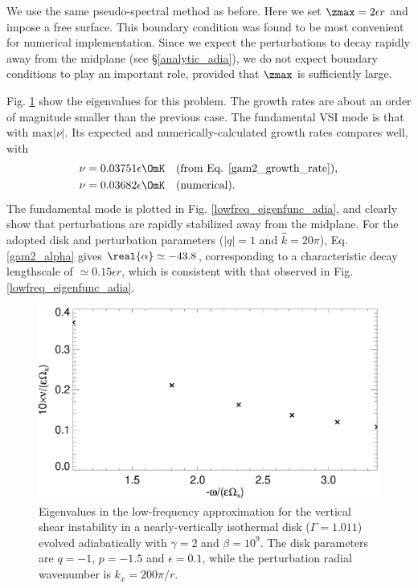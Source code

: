 We use the same pseudo-spectral method as before. Here we set
$\zmax = 2\epsilon r$ and impose a free surface. This boundary
condition was found to be most convenient for numerical
implementation. Since we expect the perturbations to decay rapidly
away from the midplane (see \S\ref{analytic_adia}), we do not expect 
boundary conditions to play an important role, provided that $\zmax$ is
sufficiently large. 

Fig. \ref{lowfreq_eigen_adia} show the eigenvalues for this
problem. The growth rates are about an order of magnitude smaller than
the previous case. The fundamental VSI mode is that with
$\mathrm{max}|\nu|$. Its expected and numerically-calculated growth
rates compares well, with 
\begin{align*}
  \nu = 0.03751 \epsilon \OmK &\quad \text{(from
    Eq. \ref{gam2_growth_rate})},\\
  \nu = 0.03682 \epsilon \OmK &\quad \text{(numerical)}.
\end{align*}
The fundamental mode is plotted in Fig. \ref{lowfreq_eigenfunc_adia},
and clearly show that perturbations are rapidly stabilized away from
the midplane. For the adopted disk and perturbation parameters 
($|q|=1$ and $\hat{k} = 20\pi$), Eq. \ref{gam2_alpha} gives $\real{\alpha}\simeq - 43.8$,
corresponding to a characteristic decay lengthscale of $\simeq
0.15\epsilon r$, which is consistent with that observed in 
Fig. \ref{lowfreq_eigenfunc_adia}. 

\begin{figure}
  \includegraphics[width=\linewidth]{figures/eigenvalues_adia}
  \caption{Eigenvalues in the low-frequency approximation for the
    vertical shear instability in a nearly-vertically isothermal disk
    ($\Gamma=1.011$) evolved adiabatically with $\gamma=2$ and
    $\beta=10^9$. The disk
    parameters are $q=-1$, 
    $p=-1.5$ and $\epsilon=0.1$, while the perturbation radial
    wavenumber is $k_x=200\pi/r$. \label{lowfreq_eigen_adia}
  }
\end{figure}
  

